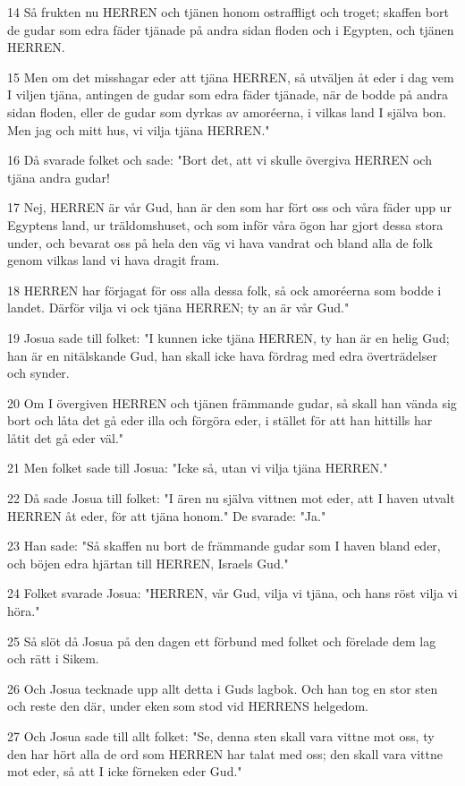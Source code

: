 \par 14 Så frukten nu HERREN och tjänen honom ostraffligt och troget; skaffen bort de gudar som edra fäder tjänade på andra sidan floden och i Egypten, och tjänen HERREN.
\par 15 Men om det misshagar eder att tjäna HERREN, så utväljen åt eder i dag vem I viljen tjäna, antingen de gudar som edra fäder tjänade, när de bodde på andra sidan floden, eller de gudar som dyrkas av amoréerna, i vilkas land I själva bon. Men jag och mitt hus, vi vilja tjäna HERREN."
\par 16 Då svarade folket och sade: "Bort det, att vi skulle övergiva HERREN och tjäna andra gudar!
\par 17 Nej, HERREN är vår Gud, han är den som har fört oss och våra fäder upp ur Egyptens land, ur träldomshuset, och som inför våra ögon har gjort dessa stora under, och bevarat oss på hela den väg vi hava vandrat och bland alla de folk genom vilkas land vi hava dragit fram.
\par 18 HERREN har förjagat för oss alla dessa folk, så ock amoréerna som bodde i landet. Därför vilja vi ock tjäna HERREN; ty an är vår Gud."
\par 19 Josua sade till folket: "I kunnen icke tjäna HERREN, ty han är en helig Gud; han är en nitälskande Gud, han skall icke hava fördrag med edra överträdelser och synder.
\par 20 Om I övergiven HERREN och tjänen främmande gudar, så skall han vända sig bort och låta det gå eder illa och förgöra eder, i stället för att han hittills har låtit det gå eder väl."
\par 21 Men folket sade till Josua: "Icke så, utan vi vilja tjäna HERREN."
\par 22 Då sade Josua till folket: "I ären nu själva vittnen mot eder, att I haven utvalt HERREN åt eder, för att tjäna honom." De svarade: "Ja."
\par 23 Han sade: "Så skaffen nu bort de främmande gudar som I haven bland eder, och böjen edra hjärtan till HERREN, Israels Gud."
\par 24 Folket svarade Josua: "HERREN, vår Gud, vilja vi tjäna, och hans röst vilja vi höra."
\par 25 Så slöt då Josua på den dagen ett förbund med folket och förelade dem lag och rätt i Sikem.
\par 26 Och Josua tecknade upp allt detta i Guds lagbok. Och han tog en stor sten och reste den där, under eken som stod vid HERRENS helgedom.
\par 27 Och Josua sade till allt folket: "Se, denna sten skall vara vittne mot oss, ty den har hört alla de ord som HERREN har talat med oss; den skall vara vittne mot eder, så att I icke förneken eder Gud."
